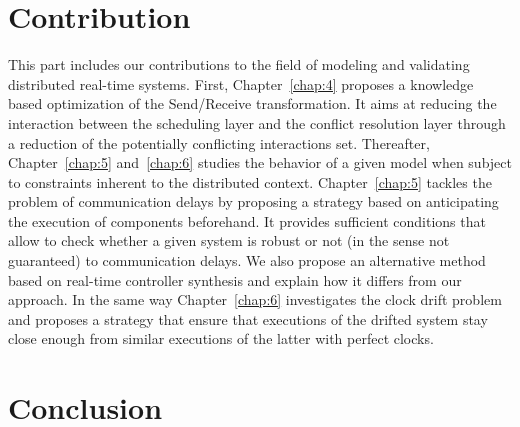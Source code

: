 \documentclass[a4paper,12pt,Times,twoside,numbered,index]{Classes/PhDThesisPSnPDF}
\begin{document}
\part{Contribution}
{This part includes our contributions to the field of modeling and validating
distributed real-time systems. First, Chapter~\ref{chap:4} proposes a knowledge based
optimization of the Send/Receive transformation. It aims at reducing the interaction between
the scheduling layer and the conflict resolution layer through a reduction of the potentially
conflicting interactions set. Thereafter, Chapter~\ref{chap:5} and~\ref{chap:6} studies the 
behavior of a given model when subject to constraints inherent to the distributed context.
Chapter~\ref{chap:5} tackles the problem of communication delays by proposing a strategy based
on anticipating the execution of components beforehand. It provides sufficient conditions
that allow to check whether a given system is robust or not (in the sense not guaranteed) 
to communication delays. We also propose an alternative method based on real-time controller
synthesis and explain how it differs from our approach. 
In the same way Chapter~\ref{chap:6} investigates the clock drift problem and proposes a strategy
that ensure that executions of the drifted system stay close enough from similar executions
of the latter with perfect clocks.
}

%



\part{Conclusion}


\listoffigures 

\listoftables 



\begin{spacing}{0.9}



\cleardoublepage





\end{spacing}
\end{document}

